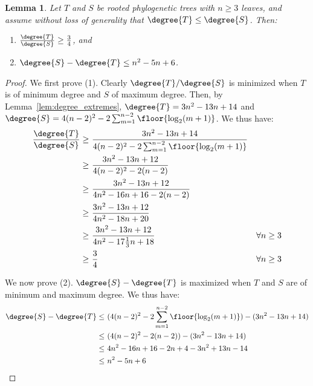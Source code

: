 \documentclass{amsart}
\newtheorem{lemma}[theorem]{Lemma}
\begin{document}
\begin{lemma}
	\label{lem:degree_max_delta}
	Let $T$ and $S$ be rooted phylogenetic trees with $n \ge 3$ leaves, and assume without loss of generality that $\degree{T} \le \degree{S}$.
	Then:
	\begin{enumerate}
		\item $\frac{\degree{T}}{\degree{S}} \ge \frac{3}{4}$, and
		\item $\degree{S} - \degree{T} \le n^2 - 5n + 6$.
	\end{enumerate}
\end{lemma}
\begin{proof}
	We first prove (1).
	Clearly $\degree{T} / \degree{S}$ is minimized when $T$ is of minimum degree and $S$ of maximum degree.
	Then, by Lemma~\ref{lem:degree_extremes}, $\degree{T} = 3n^2 - 13n + 14$ and $\degree{S} = 4(n-2)^2 - 2 \sum_{m=1}^{n-2} \floor{\log_2(m+1)}$.
	We thus have:
	\begin{align*}
		\frac{\degree{T}}{\degree{S}} \ge\ &\frac{3n^2 - 13n + 14}{4(n-2)^2 - 2 \sum_{m=1}^{n-2} \floor{\log_2(m+1)}} \\
		\ge\ &\frac{3n^2 - 13n + 12}{4(n-2)^2 - 2(n-2)} \\
		\ge\ &\frac{3n^2 - 13n + 12}{4n^2 - 16n + 16 - 2(n-2)} \\
		\ge\ &\frac{3n^2 - 13n + 12}{4n^2 - 18n + 20} \\
		\ge\ &\frac{3n^2 - 13n + 12}{4n^2 - 17\frac{1}{3}n + 18} &\forall n \ge 3 \\
		\ge\ &\frac{3}{4} &\forall n \ge 3
	\end{align*}


	We now prove (2).
	$\degree{S} - \degree{T}$  is maximized when $T$ and $S$ are of minimum and maximum degree.
	We thus have:
	\begin{align*}
		\degree{S} - \degree{T}
		\le\ &(4(n-2)^2 - 2 \sum_{m=1}^{n-2} \floor{\log_2(m+1)})
		- (3n^2 - 13n + 14) \\
		\le\ &(4(n-2)^2 - 2(n-2)) - (3n^2 - 13n + 14) \\
		\le\ &4n^2 - 16n + 16 - 2n +4 - 3n^2 + 13n - 14 \\
		\le\ &n^2 - 5n + 6
	\end{align*}
\end{proof}
\end{document}
